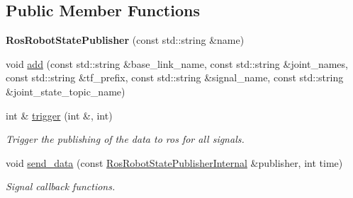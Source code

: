 \subsection*{Public Member Functions}
\begin{DoxyCompactItemize}
\item 
\mbox{\label{classdynamic__graph_1_1RosRobotStatePublisher_a7dbda339acfbacd6c2f45e7aac4409be}} 
{\bfseries Ros\+Robot\+State\+Publisher} (const std\+::string \&name)
\item 
void \hyperlink{classdynamic__graph_1_1RosRobotStatePublisher_a92094934e53306e73b6fc13d1de61b3d}{add} (const std\+::string \&base\+\_\+link\+\_\+name, const std\+::string \&joint\+\_\+names, const std\+::string \&tf\+\_\+prefix, const std\+::string \&signal\+\_\+name, const std\+::string \&joint\+\_\+state\+\_\+topic\+\_\+name)
\item 
int \& \hyperlink{classdynamic__graph_1_1RosRobotStatePublisher_a4d66defbd1b308cd06394107f55f6cbb}{trigger} (int \&, int)
\begin{DoxyCompactList}\small\item\em Trigger the publishing of the data to ros for all signals. \end{DoxyCompactList}\item 
\mbox{\label{classdynamic__graph_1_1RosRobotStatePublisher_a196621509ce1e5becada60a7093bcb3a}} 
void \hyperlink{classdynamic__graph_1_1RosRobotStatePublisher_a196621509ce1e5becada60a7093bcb3a}{send\+\_\+data} (const \hyperlink{structdynamic__graph_1_1RosRobotStatePublisherInternal}{Ros\+Robot\+State\+Publisher\+Internal} \&publisher, int time)
\begin{DoxyCompactList}\small\item\em Signal callback functions. \end{DoxyCompactList}\end{DoxyCompactItemize}
